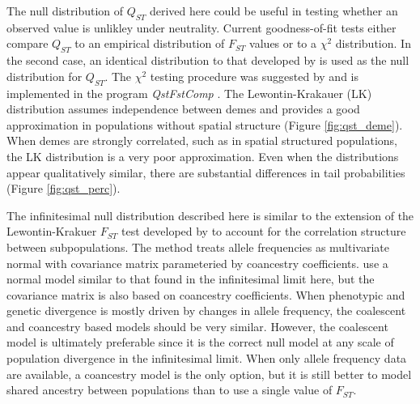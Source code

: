 The null distribution of $Q_{ST}$ derived here could be useful in testing
whether an observed value is unlikley under neutrality. Current goodness-of-fit
tests either compare $Q_{ST}$ to an empirical distribution of $F_{ST}$ values or
to a $\chi^2$ distribution. In the second case, an identical distribution to
that developed by \citet{Lewontin1973} is used as the null distribution for
$Q_{ST}$. The $\chi^2$ testing procedure was suggested by \citet{Whitlock2009}
and is implemented in the program \textit{QstFstComp} \citep{Gilbert2015}. The
Lewontin-Krakauer (LK) distribution assumes independence between demes and
provides a good approximation in populations without spatial structure (Figure
\ref{fig:qst_deme}). When demes are strongly correlated, such as in spatial
structured populations, the LK distribution is a very poor approximation. Even
when the distributions appear qualitatively similar, there are substantial
differences in tail probabilities (Figure \ref{fig:qst_perc}).

The infinitesimal null distribution described here is similar to the extension
of the Lewontin-Krakuer $F_{ST}$ test developed by \citet{Bonhomme2010} to
account for the correlation structure between subpopulations. The
\citet{Bonhomme2010} method treats allele frequencies as multivariate normal
with covariance matrix parameteried by coancestry coefficients.
\citet{Ovaskainen2011} use a normal model similar to that found in the
infinitesimal limit here, but the covariance matrix is also based on coancestry
coefficients. When phenotypic and genetic divergence is mostly driven by changes
in allele frequency, the coalescent and coancestry based models should be very
similar. However, the coalescent model is ultimately preferable since it is the
correct null model at any scale of population divergence in the infinitesimal
limit. When only allele frequency data are available, a coancestry model is the
only option, but it is still better to model shared ancestry between populations
than to use a single value of $F_{ST}$.

